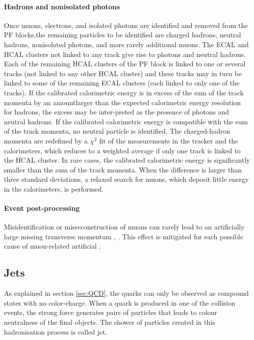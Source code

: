 \paragraph{Hadrons and nonisolated photons} Once muons, electrons, and isolated photons are identified and removed from the PF blocks,the remaining particles to be identified are charged hadrons, neutral hadrons, nonisolated photons, and more rarely additional muons. The ECAL and HCAL clusters not linked to any track give rise to photons and neutral hadrons. Each of the remaining HCAL clusters of the PF block is linked to one or several tracks (not linked to any other HCAL cluster) and these tracks may in turn be linked to some of the remaining ECAL clusters (each linked to only one of the tracks). If the calibrated calorimetric energy is in excess of the sum of the track momenta by an amountlarger than the expected calorimetric energy resolution for hadrons, the excess may be inter-preted as the presence of photons and neutral hadrons. If the calibrated calorimetric energy is compatible with the sum of the track momenta, no neutral particle is identified.  The charged-hadron momenta are redefined by a $\chi^2$ fit of the measurements in the tracker and the calorimeters,  which reduces to a weighted average if only one track is linked to the HCAL cluster. In  rare  cases,  the  calibrated  calorimetric  energy  is  significantly  smaller  than  the  sum  of  the track momenta. When the difference is larger than three standard deviations, a relaxed search for muons,  which deposit little energy in the calorimeters,  is performed.

\paragraph{Event post-processing} Misidentification or misreconstruction of muons can rarely lead to an artificially large missing transverse momentum , \PTm. This effect is mitigated for each possible cause of muon-related artificial \PTm \cite{CMS-PRF-14-001}.

\subsection{Jets}
\label{sec:jet_clustering}

As explained in section \ref{sec:QCD}, the quarks can only be observed as compound states with no color-charge. When a quark is produced in one of the collision events, the strong force generates pairs of particles that leads to colour neutralness of the final objects. The shower of particles created in this hadronisation process is called jet.

